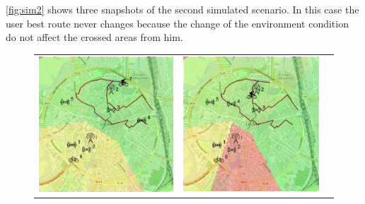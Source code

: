 \noindent \autoref{fig:sim2} shows three snapshots of the second simulated scenario.
In this case the user best route never changes because the change of the environment condition do not affect the crossed areas from him.
% 
\begin{figure}[h]
    \centering
    \begin{tabular}{lll}
         \includegraphics[scale=0.42]{figures/sim2snap1.png}  &
         \includegraphics[scale=0.42]{figures/sim2snap2.png} &

\end{tabular}
\end{figure}
